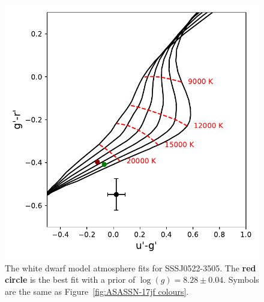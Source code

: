 \begin{figure}
    \centering
    \includegraphics[width=\columnwidth, trim={0 0 0 0}, clip]{figures/results/three_cvs_with_weird_colours/SSS111126/PhysicalParams/SSS111126_colourPlot_alpha_beta.pdf}
    \caption{The white dwarf model atmosphere fits for SSSJ0522-3505. The {\bf red circle} is the best fit with a prior of $\log(g)=8.28\pm0.04$. Symbols are the same as Figure~\ref{fig:ASASSN-17jf colours}.}
    \label{fig:SSSJ0522-3505 colours}
\end{figure}

